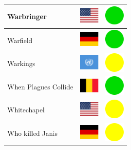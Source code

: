 \documentclass[12pt, a4paper, twoside]{report}
\begin{document}
\begin{center}
\begin{longtable}{|p{5cm}|p{2cm}|p{2cm}|}
Warbringer & \includegraphics[width=1cm]{4x3/us} & \includegraphics[width=1cm]{likes/y} \\ \hline
Warfield & \includegraphics[width=1cm]{4x3/de} & \includegraphics[width=1cm]{likes/y} \\ \hline
Warkings & \includegraphics[width=1cm]{4x3/un} & \includegraphics[width=1cm]{likes/m} \\ \hline
When Plagues Collide & \includegraphics[width=1cm]{4x3/be} & \includegraphics[width=1cm]{likes/y} \\ \hline
Whitechapel & \includegraphics[width=1cm]{4x3/us} & \includegraphics[width=1cm]{likes/m} \\ \hline
Who killed Janis & \includegraphics[width=1cm]{4x3/de} & \includegraphics[width=1cm]{likes/m} \\ \hline

\end{longtable}
\end{center}
\end{document}
